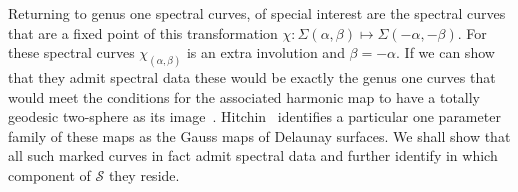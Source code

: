 \documentclass{article}
\begin{document}

Returning to genus one spectral curves, of special interest are the spectral curves that are a fixed point of this transformation $\chi: \Sigma(\alpha,\beta) \mapsto \Sigma(-\alpha,-\beta)$. For these spectral curves $\chi_{(\alpha,\beta)}$ is an extra involution and $\beta=-\alpha$. If we can show that they admit spectral data these would be exactly the genus one curves that would meet the conditions for the associated harmonic map to have a totally geodesic two-sphere as its image~\cite[]{Hitchin1990}. Hitchin~\cite[p693]{Hitchin1990} identifies a particular one parameter family of these maps as the Gauss maps of Delaunay surfaces. We shall show that all such marked curves in fact admit spectral data and further identify in which component of $\mathcal{S}$ they reside.
\end{document}
